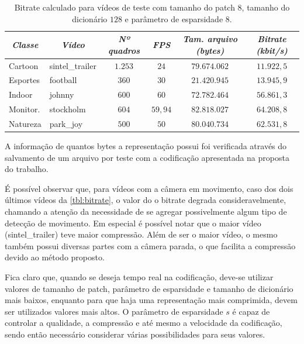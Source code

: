 \documentclass[cic,tc]{iiufrgs}
\begin{document}
\begin{table}[h]
    \caption{Bitrate calculado para vídeos de teste com tamanho do patch $8$, tamanho do 
    dicionário $128$ e parâmetro de esparsidade $8$.}
    \centering
        \begin{tabular}{|l|l|c|c|c|c|}
          \hline
          \multicolumn{1}{|c}{\textit{Classe}} & 
          \multicolumn{1}{|c}{\textit{Vídeo}} & 
          \multicolumn{1}{|c}{\textit{Nº quadros}} & 
          \multicolumn{1}{|c}{\textit{FPS}} & 
          \multicolumn{1}{|c}{\textit{Tam. arquivo (bytes)}} & 
          \multicolumn{1}{|c|}{\textit{Bitrate (kbit/s)}} \\
          \hline
          \hline
          Cartoon & sintel\_trailer & $1.253$ & $24$ & $79.674.062$ & $11.922,5$ \\
          Esportes & football &  $360$ & $30$ & $21.420.945$ & $13.945,9$ \\
          Indoor & johnny  &   $600$ & $60$ & $72.782.464$ & $56.861,3$ \\
          Monitor. & stockholm & $604$ & $59,94$ & $82.818.027$ & $64.208,8$ \\
          Natureza & park\_joy & $500$ & $50$ & $80.040.734$ & $62.531,8$ \\
          \hline
        \end{tabular}
    \label{tbl:bitrate}
\end{table}

A informação de quantos bytes a representação possui foi verificada através do salvamento
de um arquivo por teste com a codificação apresentada na proposta do trabalho.

É possível observar que, para vídeos com a câmera em movimento, caso dos dois últimos vídeos da \autoref{tbl:bitrate}, 
o valor do
o bitrate degrada consideravelmente, chamando a atenção da necessidade de se agregar possivelmente
algum tipo de detecção de movimento.
Em especial é possível notar que o maior vídeo (sintel\_trailer) teve maior compressão.
Além de ser o maior vídeo, o mesmo também possui diversas partes com a câmera parada, 
o que facilita a compressão devido ao método proposto.

Fica claro que, quando se deseja tempo real na codificação, deve-se utilizar valores 
de tamanho de patch, parâmetro de esparsidade e tamanho de dicionário mais baixos, enquanto para 
que haja uma representação mais comprimida, 
devem ser utilizados valores mais altos.
O parâmetro de esparsidade $s$ é capaz de controlar a qualidade, a compressão e até mesmo a velocidade 
da codificação, sendo então necessário considerar várias possibilidades para seus valores.
\end{document}
